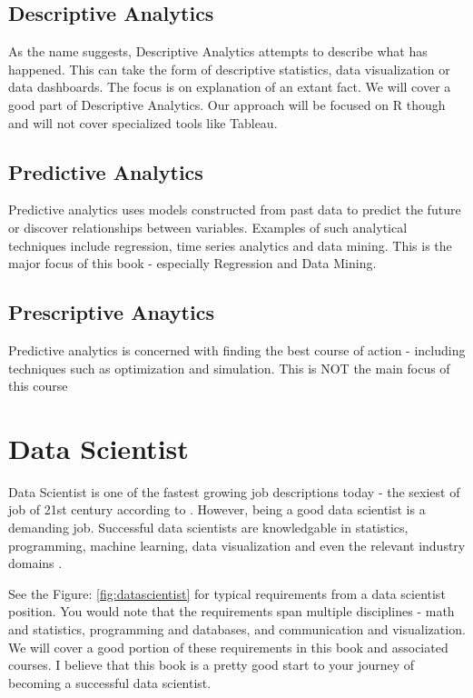 \documentclass[10pt, letterpaper, twoside]{memoir}\usepackage{knitr}
\begin{document}
\subsection{Descriptive Analytics}

As the name suggests, Descriptive Analytics attempts to describe what has happened. This can take the form of descriptive statistics, data visualization or data dashboards. The focus is on explanation of an extant fact. We will cover a good part of Descriptive Analytics. Our approach will be focused on R though and will not cover specialized tools like Tableau.

\subsection{Predictive Analytics}

Predictive analytics uses models constructed from past data to predict the future or discover relationships between variables. Examples of such analytical techniques include regression, time series analytics and data mining. This is the major focus of this book - especially Regression and Data Mining.

\subsection{Prescriptive Anaytics}

Predictive analytics is concerned with finding the best course of action - including techniques such as optimization and simulation. This is NOT the main focus of this course

\section{Data Scientist}

Data Scientist is one of the fastest growing job descriptions today - the sexiest of job of 21st century according to \citet{patil2012data}.  However, being a good data scientist is a demanding job. Successful data scientists are knowledgable in statistics, programming, machine learning, data visualization and even the relevant industry domains \citep{8SkillsY88:online}.

See the Figure: \ref{fig:datascientist} for typical requirements from a data scientist position. You would note that the requirements span multiple disciplines - math and statistics, programming and databases, and communication and visualization. We will cover a good portion of these requirements in this book and associated courses. I believe that this book is a pretty good start to your journey of becoming a successful data scientist.
\end{document}
